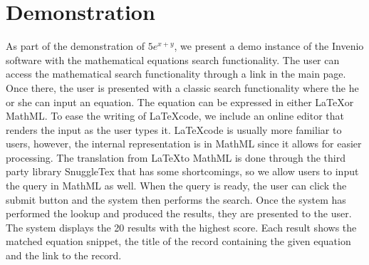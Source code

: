 \documentclass{sig-alternate}
\begin{document}
\section{Demonstration}
As part of the demonstration of $5e^{x+y}$, we present a demo instance of the Invenio software with the mathematical equations search functionality.
The user can access the mathematical search functionality through a link in the main page. Once there, the user is presented with a classic search functionality where the he or she can input an equation. The equation can be expressed in either \LaTeX or MathML. To ease the writing of \LaTeX code, we include an online editor\cite{latex_editor} that renders the input as the user types it. \LaTeX code is usually more familiar to users, however, the internal representation is in MathML since it allows for easier processing. The translation from \LaTeX to MathML is done through the third party library SnuggleTex\cite{snuggletex} that has some shortcomings, so we allow users to input the query in MathML as well. When the query is ready, the user can click the submit button and the system then performs the search. Once the system has performed the lookup and produced the results, they are presented to the user.
The system displays the 20 results with the highest score. Each result shows the matched equation snippet, the title of the record containing the given equation and the link to the record.

%
\end{document}
